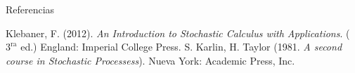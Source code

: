 \documentclass{beamer}
\renewcommand{\1}{\mathds{1}}
\theoremstyle{definition}
\theoremstyle{definition}
\theoremstyle{definition}
\theoremstyle{definition}
\theoremstyle{definition}
\begin{document}
\begin{frame}[allowframebreaks=1]{Referencias} %
		\begin{thebibliography}{2} %
             Klebaner, F. (2012). \emph{An Introduction to Stochastic Calculus with Applications}. ($3^\text{ra}$ ed.) England: Imperial College Press.
             S. Karlin, H. Taylor (1981. \emph{A second course in Stochastic Processess}). Nueva York: Academic Press, Inc.
	\end{thebibliography}
\end{frame}
\end{document}
